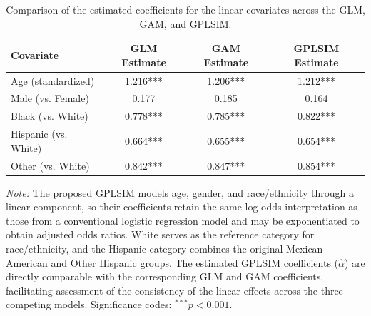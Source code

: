 \begin{table}[ht!]
\centering
\caption{Comparison of the estimated coefficients for the linear covariates across the GLM, GAM, and GPLSIM.}
\label{tab:linear_covariates}
\small
\begin{tabular}{lccc}
\toprule
\textbf{Covariate}
& \textbf{GLM Estimate}
& \textbf{GAM Estimate}
& \textbf{GPLSIM Estimate} \\
\midrule

Age (standardized)
&
1.216***
&
1.206***
&
1.212*** \\

Male (vs. Female)
&
0.177
&
0.185
&
0.164 \\

Black (vs. White)
&
0.778***
&
0.785***
&
0.822*** \\

Hispanic (vs. White)
&
0.664***
&
0.655***
&
0.654*** \\

Other (vs. White)
&
0.842***
&
0.847***
&
0.854*** \\

\bottomrule
\end{tabular}

\vspace{0.15cm}
\begin{minipage}{0.96\textwidth}
\footnotesize
\textit{Note:}
The proposed GPLSIM models age, gender, and race/ethnicity through a linear component, so their coefficients retain the same log-odds interpretation as those from a conventional logistic regression model and may be exponentiated to obtain adjusted odds ratios. White serves as the reference category for race/ethnicity, and the Hispanic category combines the original Mexican American and Other Hispanic groups. The estimated GPLSIM coefficients ($\hat{\alpha}$) are directly comparable with the corresponding GLM and GAM coefficients, facilitating assessment of the consistency of the linear effects across the three competing models. Significance codes: $^{***}p<0.001$.
\end{minipage}
\end{table}



